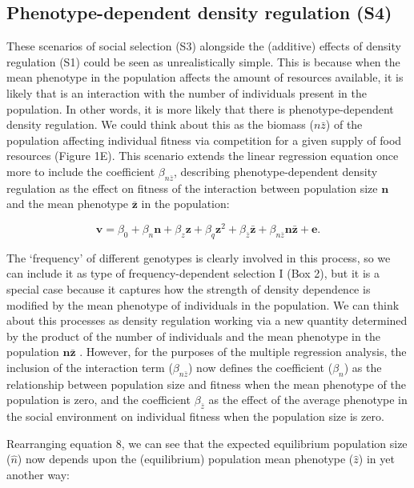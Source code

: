 \documentclass{article}
\begin{document}
\subsection{Phenotype-dependent density regulation (S4)}
These scenarios of social selection (S3) alongside the (additive) effects of density regulation (S1) could be seen as unrealistically simple. This is because when the mean phenotype in the population affects the amount of resources available, it is likely that is an interaction with the number of individuals present in the population. In other words, it is more likely that there is phenotype-dependent density regulation. We could think about this as the biomass (${n\bar{z}}$) of the population affecting individual fitness via competition for a given supply of food resources (Figure 1E). This scenario extends the linear regression equation once more to include the coefficient $\beta_{n \bar{z}}$, describing phenotype-dependent density regulation as the effect on fitness of the interaction between population size $\bm{n}$ and the mean phenotype $\bar{\bm{z}}$ in the population: 

\begin{equation} \label{eq: PDDR}
\bm{v}=\beta_{0} +\beta_{n} \bm{n} + \beta_{z} \bm{z} + \beta_{q} \bm{z}^2 + \beta_{\bar{z}} \bar{\bm{z}} + \beta_{n\bar{z}} \bm{n} \bar{\bm{z}}  +  \bm{e}.
\end{equation}

The `frequency' of different genotypes is clearly involved in this process, so we can include it as type of frequency-dependent selection I (Box 2), but it is a special case because it captures how the strength of density dependence is modified by the mean phenotype of individuals in the population. We can think about this processes as density regulation working via a new quantity determined by the product of the number of individuals and the mean phenotype in the population $\bm{n}\bar{\bm{z}}$ \citep{Engen2020}. However, for the purposes of the multiple regression analysis, the inclusion of the interaction term ($\beta_{n\bar{z}}$) now defines the coefficient ($\beta_{n}$) as the relationship between population size and fitness when the mean phenotype of the population is zero, and the coefficient $ \beta_{\bar{z}}$ as the effect of the average phenotype in the social environment on individual fitness when the population size is zero. 

Rearranging equation 8, we can see that the expected equilibrium population size ($\hat{n}$) now depends upon the (equilibrium) population mean phenotype ($\hat{z}$) in yet another way:
\end{document}
